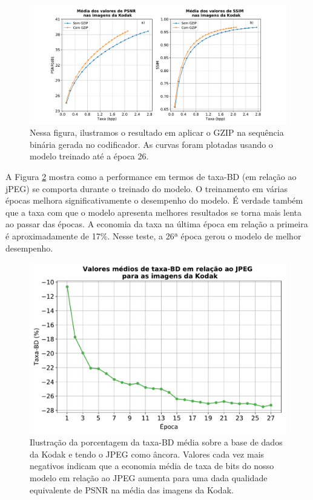 \begin{figure}
	\centering
	\includegraphics[width=1.1\textwidth]{figuras/gain_gzip_media.pdf}
	\caption[Comparação de codificação com e sem o GZIP]{Nessa figura, ilustramos o resultado em aplicar o GZIP na sequência binária gerada no codificador. As curvas foram plotadas usando o modelo treinado até a época 26.}  	
	\label{fig:gain_gzip_meida}
\end{figure}

A Figura \ref{fig:taxa_bd} mostra como a performance em termos de taxa-BD (em relação ao jPEG) se comporta durante o treinado do modelo. O treinamento em várias épocas melhora significativamente o desempenho do modelo. É verdade também que a taxa com que o modelo apresenta melhores resultados se torna mais lenta ao passar das épocas. A economia da taxa na última época em relação a primeira é aproximadamente de 17\%. Nesse teste, a 26ª época gerou o modelo de melhor desempenho.  



\begin{figure}
	\centering
	\includegraphics[width=1\textwidth]{figuras/taxa_bd_27epocas.pdf}
	\caption{Ilustração da porcentagem da taxa-BD média sobre a base de dados da Kodak e tendo o JPEG como âncora.  Valores cada vez mais negativos indicam que a economia média de taxa de bits do nosso modelo em relação ao JPEG aumenta para uma dada qualidade equivalente de PSNR na média das imagens da Kodak.}  
	\label{fig:taxa_bd}
\end{figure}	

